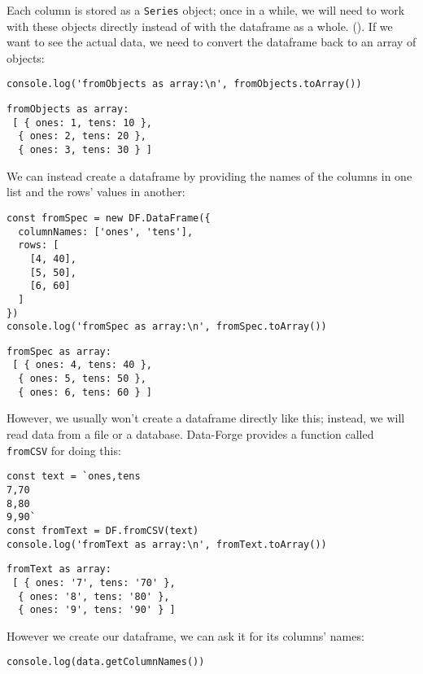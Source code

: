 Each column is stored as a \texttt{Series} object;
once in a while,
we will need to work with these objects directly
instead of with the dataframe as a whole.
().
If we want to see the actual data,
we need to convert the dataframe back to an array of objects:


\begin{verbatim}
console.log('fromObjects as array:\n', fromObjects.toArray())
\end{verbatim}

\begin{verbatim}
fromObjects as array:
 [ { ones: 1, tens: 10 },
  { ones: 2, tens: 20 },
  { ones: 3, tens: 30 } ]
\end{verbatim}

We can instead create a dataframe by providing the names of the columns in one list
and the rows' values in another:

\begin{verbatim}
const fromSpec = new DF.DataFrame({
  columnNames: ['ones', 'tens'],
  rows: [
    [4, 40],
    [5, 50],
    [6, 60]
  ]
})
console.log('fromSpec as array:\n', fromSpec.toArray())
\end{verbatim}

\begin{verbatim}
fromSpec as array:
 [ { ones: 4, tens: 40 },
  { ones: 5, tens: 50 },
  { ones: 6, tens: 60 } ]
\end{verbatim}

However,
we usually won't create a dataframe directly like this;
instead,
we will read data from a file or a database.
Data-Forge provides a function called \texttt{fromCSV} for doing this:

\begin{verbatim}
const text = `ones,tens
7,70
8,80
9,90`
const fromText = DF.fromCSV(text)
console.log('fromText as array:\n', fromText.toArray())
\end{verbatim}

\begin{verbatim}
fromText as array:
 [ { ones: '7', tens: '70' },
  { ones: '8', tens: '80' },
  { ones: '9', tens: '90' } ]
\end{verbatim}

However we create our dataframe,
we can ask it for its columns' names:

\begin{verbatim}
console.log(data.getColumnNames())
\end{verbatim}

